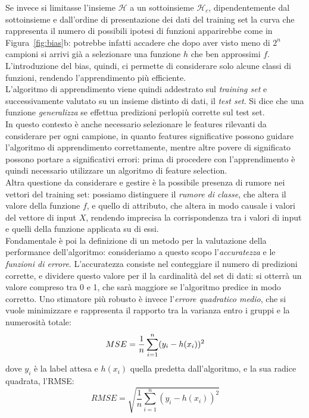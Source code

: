 \documentclass{article}
\begin{document}
	Se invece si limitasse l'insieme $\mathcal{H}$ a un sottoinsieme $\mathcal{H}_c$, dipendentemente dal sottoinsieme e dall'ordine di presentazione dei dati del training set la curva che rappresenta il numero di possibili ipotesi di funzioni apparirebbe come in Figura~\ref{fig:bias}b: potrebbe infatti accadere che dopo aver visto meno di $2^n$ campioni si arrivi già a selezionare una funzione $h$ che ben approssimi $f$. L'introduzione del bias, quindi, ci permette di considerare solo alcune classi di funzioni, rendendo l'apprendimento più efficiente.\\
	
	L'algoritmo di apprendimento viene quindi addestrato sul \textit{training set} e successivamente valutato su un insieme distinto di dati, il \textit{test set}. Si dice che una funzione \textit{generalizza} se effettua predizioni perlopiù corrette sul test set.\\
	In questo contesto è anche necessario selezionare le features rilevanti da considerare per ogni campione, in quanto features significative possono guidare l'algoritmo di apprendimento correttamente, mentre altre povere di significato possono portare a significativi errori: prima di procedere con l'apprendimento è quindi necessario utilizzare un algoritmo di feature selection. \\
	Altra questione da considerare e gestire è la possibile presenza di rumore nei vettori del training set: possiamo distinguere il \textit{rumore di classe}, che altera il valore della funzione $f$, e quello di attributo, che altera in modo causale i valori del vettore di input $X$, rendendo imprecisa la corrispondenza tra i valori di input e quelli della funzione applicata su di essi.\\
	
	Fondamentale è poi la definizione di un metodo per la valutazione della performance dell'algoritmo: consideriamo a questo scopo l'\textit{accuratezza} e le \textit{funzioni di errore}. L'accuratezza consiste nel conteggiare il numero di predizioni corrette, e dividere questo valore per il la cardinalità del set di dati: si otterrà un valore compreso tra 0 e 1, che sarà maggiore se l'algoritmo predice in modo corretto. Uno stimatore più robusto è invece l'\textit{errore quadratico medio}, che si vuole minimizzare e rappresenta il rapporto tra la varianza entro i gruppi e la numerosità totale:\\
	\[
	MSE={1\over n}\sum_{i=1}^n (y_i-h(x_i))^2
	\]
	dove $y_i$ è la label attesa e $h(x_i)$ quella predetta dall'algoritmo, e la sua radice quadrata, l'RMSE:\\
	\[
	RMSE = \sqrt{\frac{1}{n}\sum_{i=1}^{n}(y_{i} - h(x_{i}))^{2}}
	\]\\
\end{document}
